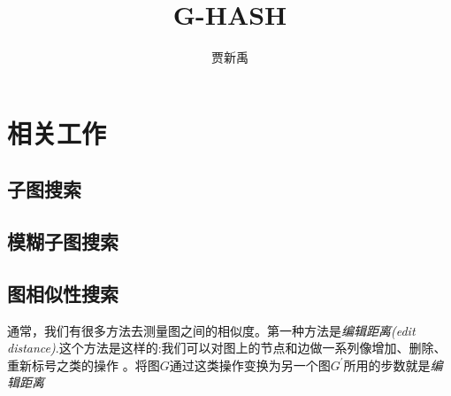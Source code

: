\documentclass[12pt]{article}
\title{G-HASH\cite{G-HASH}}
\author{贾新禹}
\begin{document}
\maketitle
\section{相关工作}
\subsection{子图搜索}
\subsection{模糊子图搜索}
\subsection{图相似性搜索}
通常，我们有很多方法去测量图之间的相似度。第一种方法是\emph{编辑距离(edit distance)}.这个方法是这样的:我们可以对图上的节点和边做一系列像增加、删除、重新标号之类的操作 。将图$G$通过这类操作变换为另一个图$G^{'}$所用的步数就是\emph{编辑距离}

%
%
\end{document}

